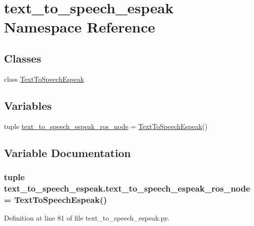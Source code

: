 \hypertarget{namespacetext__to__speech__espeak}{\section{text\-\_\-to\-\_\-speech\-\_\-espeak Namespace Reference}
\label{namespacetext__to__speech__espeak}
}
\subsection*{Classes}
\begin{DoxyCompactItemize}
\item 
class \hyperlink{classtext__to__speech__espeak_1_1TextToSpeechEspeak}{Text\-To\-Speech\-Espeak}
\end{DoxyCompactItemize}
\subsection*{Variables}
\begin{DoxyCompactItemize}
\item 
tuple \hyperlink{namespacetext__to__speech__espeak_a9bdb1306d820edf490e227c108cd1dfa}{text\-\_\-to\-\_\-speech\-\_\-espeak\-\_\-ros\-\_\-node} = \hyperlink{classtext__to__speech__espeak_1_1TextToSpeechEspeak}{Text\-To\-Speech\-Espeak}()
\end{DoxyCompactItemize}


\subsection{Variable Documentation}
\hypertarget{namespacetext__to__speech__espeak_a9bdb1306d820edf490e227c108cd1dfa}{
\subsubsection[{text\-\_\-to\-\_\-speech\-\_\-espeak\-\_\-ros\-\_\-node}]{\setlength{\rightskip}{0pt plus 5cm}tuple text\-\_\-to\-\_\-speech\-\_\-espeak.\-text\-\_\-to\-\_\-speech\-\_\-espeak\-\_\-ros\-\_\-node = {\bf Text\-To\-Speech\-Espeak}()}}\label{namespacetext__to__speech__espeak_a9bdb1306d820edf490e227c108cd1dfa}


Definition at line 81 of file text\-\_\-to\-\_\-speech\-\_\-espeak.\-py.

